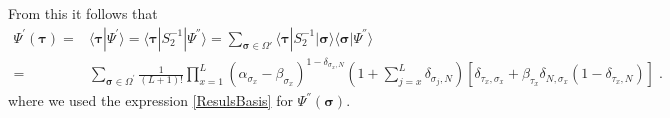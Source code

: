 \documentclass[10pt]{article}
\numberwithin{equation}{section}
\numberwithin{equation}{subsection}
\newcommand{\dt}{\;.}
\begin{document}
From this it follows that
\begin{align}\label{ABS_intermediate}
		\Psi^{'}(\bm{\tau})=&\langle\bm{\tau}|\Psi^{'}\rangle=\langle \bm{\tau}|S_{2}^{-1}|\Psi^{''}\rangle = \sum_{\bm{\sigma}\in \Omega'}  \langle \bm{\tau}|S_{2}^{-1} |\bm{\sigma}\rangle\langle\bm{\sigma}|\Psi^{''}\rangle \nonumber\\=&\sum_{\bm{\sigma}\in \Omega^{'}}\frac{1}{(L+1)!}\prod_{x=1}^L(\alpha_{\sigma_{x}}-\beta_{\sigma_{x}})^{1-\delta_{\sigma_{x},N}}\left(1+\sum_{j=x}^{L}\delta_{\sigma_{j},N}\right)\left[ \delta_{\tau_x,\sigma_x}+\beta_{\tau_x} \delta_{N,\sigma_x} (1-\delta_{\tau_x,N})\right]\dt
	\end{align}
	where we used the expression \eqref{ResulsBasis} for $\Psi^{''}(\bm{\sigma})$.
\begin{comment}
{\color{blue}
	Old proposal
\begin{equation*}
	\begin{split}
		\Psi^{'}(\bm{\tau})&=\langle \bm{\tau}|(\mathcal{S}_{2}^{-1})^{\otimes L}|\Psi^{''}\rangle\\&= \Psi^{''}(\bm{\tau})+\sum_{q_{1}= 1}^{L}(1-\delta_{\tau_{q_{1}},N})\Psi^{''}(\varphi_{1}^{1},\ldots,\varphi_{L}^{1})\beta_{q_{1}^{1}}\\&+
		\sum_{q_{1},q_{2}= 1}^{L}(1-\delta_{\tau_{q_{1}},N})(1-\delta_{\tau_{q_{2}},N})\Psi^{''}(\varphi_{1}^{2},\ldots,\varphi_{L}^{2})\beta_{q_{1}}\beta_{q_{2}}\\&+\ldots+\Psi^{''}(N,\ldots,N)\left(\prod_{x=1}^{L}(1-\delta_{\tau_{x},N})\right)\prod_{x=1}^{L}\beta_{\tau_{x}}\dt%
	\end{split}
\end{equation*}}
{\color{blue}
	Other proposal
\begin{equation*}
	\begin{split}
		\Psi^{'}(\bm{\tau})&=\langle \bm{\tau}|(\mathcal{S}_{2}^{-1})^{\otimes L}|\Psi^{''}\rangle\\&= \Psi^{''}(\bm{\tau})+\sum_{q_{1}= 1}^{L}(1-\delta_{\tau_{q_{1}},N})\Psi^{''}(\tau_{1},\ldots,\tau_{q_{1}}=N,\ldots,\tau_{L})\beta_{q_{1}^{1}}\\&+
		\sum_{q_{1},q_{2}= 1}^{L}(1-\delta_{\tau_{q_{1}},N})(1-\delta_{\tau_{q_{2}},N})\Psi^{''}(\tau_{1},\ldots,\tau_{q_{1}}=N,\ldots,\tau_{q_{2}}=N,\ldots,\tau_{L})\beta_{q_{1}}\beta_{q_{2}}\\&+\ldots+\Psi^{''}(N,\ldots,N)\left(\prod_{x=1}^{L}(1-\delta_{\tau_{x},N})\right)\prod_{x=1}^{L}\beta_{\tau_{x}}\dt%
	\end{split}
\end{equation*}
}
\end{comment}
\end{document}
